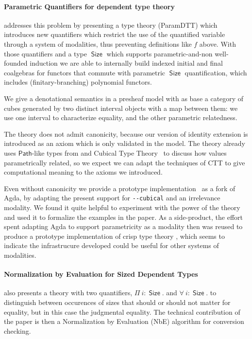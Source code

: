\documentclass{book}
\DeclareMathOperator{\Size}{\mathsf{Size}}
\begin{document}
\paragraph{Parametric Quantifiers for dependent type theory}
addresses this problem by presenting a type theory (ParamDTT) which
introduces new quantifiers which restrict the use of the quantified
variable through a system of modalities, thus preventing definitions
like $f$ above.  With those quantifiers and a type $\Size$ which
supports parametric-and-non well-founded induction we are able to
internally build indexed initial and final coalgebras for functors
that commute with parametric $\Size$ quantification, which includes
(finitary-branching) polynomial functors.

We give a denotational semantics in a presheaf model with as base a category
of cubes generated by two distinct interval objects with a map between
them: we use one interval to characterize equality, and the other parametric
relatedness.

The theory does not admit canonicity, because our version of identity
extension is introduced as an axiom which is only validated in the
model.  The theory already uses $\mathsf{Path}$-like types from
\cite{moulin:mfps15} and Cubical Type Theory~\cite{cohenCoquandHuberMortberg:cubical}
to discuss how values parametrically related, so we expect we
can adapt the techniques of CTT to give computational meaning to the
axioms we introduced.

Even without canonicity we provide a prototype implementation~\cite{agda:parametric} as a
fork of Agda, by adapting the present support for \verb|--cubical| and an
irrelevance modality. We found it quite helpful to experiment with the
power of the theory and used it to formalize the examples in the
paper. As a side-product, the effort spent adapting Agda to support
parametricity as a modality then was reused to produce a prototype
implementation\cite{agda:flat} of crisp type theory \cite{licata:internalUniverses}
, which seems to indicate the infrastrucure developed
could be useful for other systems of modalities.


\paragraph{Normalization by Evaluation for Sized Dependent Types}
also presents a theory with two quantifiers, $\Pi~i : \Size.$ and $\forall~i : \Size.$
to distinguish between occurences of sizes that should or should not
matter for equality, but in this case the judgmental equality.
The technical contribution of the paper is then a Normalization by
Evaluation (NbE) algorithm for conversion checking.
\end{document}
